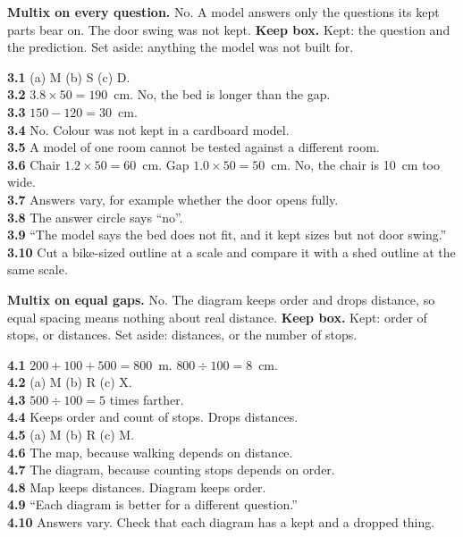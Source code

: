 \textbf{Multix on every question.} No. A model answers only the questions its kept parts bear on. The door swing was not kept. \textbf{Keep box.} Kept: the question and the prediction. Set aside: anything the model was not built for.

\textbf{3.1} (a) M (b) S (c) D.\\
\textbf{3.2} $3.8\times50=190$~cm. No, the bed is longer than the gap.\\
\textbf{3.3} $150-120=30$~cm.\\
\textbf{3.4} No. Colour was not kept in a cardboard model.\\
\textbf{3.5} A model of one room cannot be tested against a different room.\\
\textbf{3.6} Chair $1.2\times50=60$~cm. Gap $1.0\times50=50$~cm. No, the chair is 10~cm too wide.\\
\textbf{3.7} Answers vary, for example whether the door opens fully.\\
\textbf{3.8} The answer circle says ``no''.\\
\textbf{3.9} ``The model says the bed does not fit, and it kept sizes but not door swing.''\\
\textbf{3.10} Cut a bike-sized outline at a scale and compare it with a shed outline at the same scale.

\textbf{Multix on equal gaps.} No. The diagram keeps order and drops distance, so equal spacing means nothing about real distance. \textbf{Keep box.} Kept: order of stops, or distances. Set aside: distances, or the number of stops.

\textbf{4.1} $200+100+500=800$~m. $800\div100=8$~cm.\\
\textbf{4.2} (a) M (b) R (c) X.\\
\textbf{4.3} $500\div100=5$ times farther.\\
\textbf{4.4} Keeps order and count of stops. Drops distances.\\
\textbf{4.5} (a) M (b) R (c) M.\\
\textbf{4.6} The map, because walking depends on distance.\\
\textbf{4.7} The diagram, because counting stops depends on order.\\
\textbf{4.8} Map keeps distances. Diagram keeps order.\\
\textbf{4.9} ``Each diagram is better for a different question.''\\
\textbf{4.10} Answers vary. Check that each diagram has a kept and a dropped thing.

